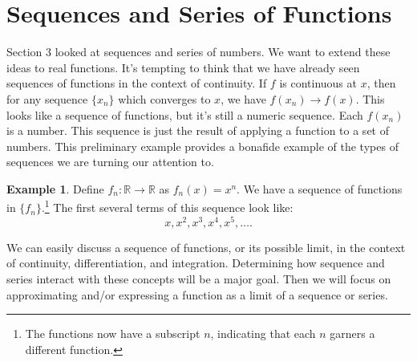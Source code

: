 \documentclass{article}
\newcommand{\R}{\mathbb{R}}
\theoremstyle{definition}
\newtheorem{example}{Example}[section]
\begin{document}
\section{Sequences and Series of Functions}
Section 3 looked at sequences and series of numbers. We want to extend these ideas to real functions. It's tempting to think that we have already seen sequences of functions in the context of continuity. If $ f $ is continuous at $ x $, then for any sequence $ \{x_n\} $ which converges to $ x $, we have $ f(x_n)\to f(x) $. This looks like a sequence of functions, but it's still a numeric sequence. Each $ f(x_n) $ is a number. This sequence is just the result of applying a function to a set of numbers. This preliminary example provides a bonafide example of the types of sequences we are turning our attention to.
\begin{example}
	Define $ f_n:\R\to\R $ as $ f_n(x)=x^n $. We have a sequence of functions in $ \{f_n\} $.\footnote{The functions now have a subscript $ n $, indicating that each $ n $ garners a different function.} The first several terms of this sequence look like: $$ x,x^2,x^3,x^4,x^5,\ldots.$$
\end{example} 
We can easily discuss a sequence of functions, or its possible limit, in the context of continuity, differentiation, and integration. Determining how sequence and series interact with these concepts will be a major goal. Then we will focus on approximating and/or expressing a function as a limit of a sequence or series.  
\end{document}
